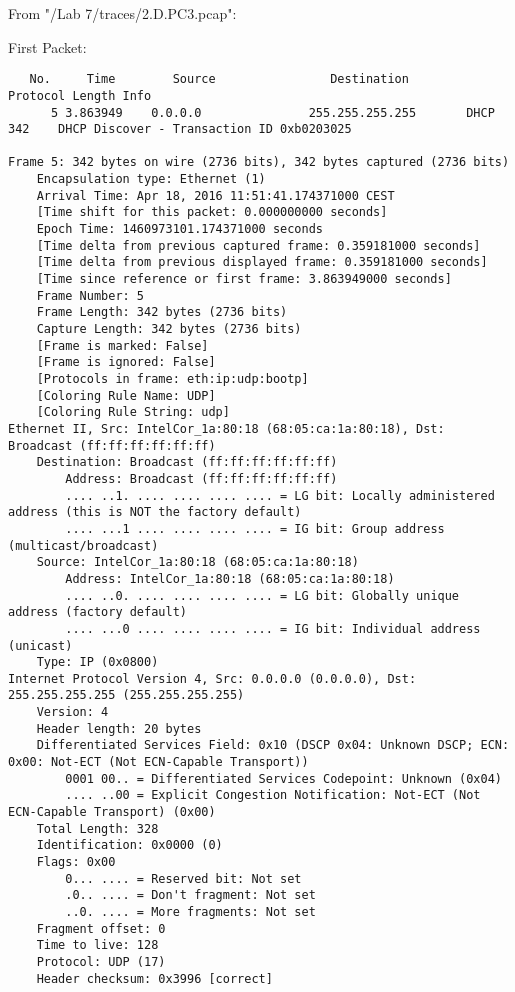 From "/Lab 7/traces/2.D.PC3.pcap":

First Packet:\\

\begin{lstlisting}
   No.     Time        Source                Destination           Protocol Length Info
      5 3.863949    0.0.0.0               255.255.255.255       DHCP     342    DHCP Discover - Transaction ID 0xb0203025

Frame 5: 342 bytes on wire (2736 bits), 342 bytes captured (2736 bits)
    Encapsulation type: Ethernet (1)
    Arrival Time: Apr 18, 2016 11:51:41.174371000 CEST
    [Time shift for this packet: 0.000000000 seconds]
    Epoch Time: 1460973101.174371000 seconds
    [Time delta from previous captured frame: 0.359181000 seconds]
    [Time delta from previous displayed frame: 0.359181000 seconds]
    [Time since reference or first frame: 3.863949000 seconds]
    Frame Number: 5
    Frame Length: 342 bytes (2736 bits)
    Capture Length: 342 bytes (2736 bits)
    [Frame is marked: False]
    [Frame is ignored: False]
    [Protocols in frame: eth:ip:udp:bootp]
    [Coloring Rule Name: UDP]
    [Coloring Rule String: udp]
Ethernet II, Src: IntelCor_1a:80:18 (68:05:ca:1a:80:18), Dst: Broadcast (ff:ff:ff:ff:ff:ff)
    Destination: Broadcast (ff:ff:ff:ff:ff:ff)
        Address: Broadcast (ff:ff:ff:ff:ff:ff)
        .... ..1. .... .... .... .... = LG bit: Locally administered address (this is NOT the factory default)
        .... ...1 .... .... .... .... = IG bit: Group address (multicast/broadcast)
    Source: IntelCor_1a:80:18 (68:05:ca:1a:80:18)
        Address: IntelCor_1a:80:18 (68:05:ca:1a:80:18)
        .... ..0. .... .... .... .... = LG bit: Globally unique address (factory default)
        .... ...0 .... .... .... .... = IG bit: Individual address (unicast)
    Type: IP (0x0800)
Internet Protocol Version 4, Src: 0.0.0.0 (0.0.0.0), Dst: 255.255.255.255 (255.255.255.255)
    Version: 4
    Header length: 20 bytes
    Differentiated Services Field: 0x10 (DSCP 0x04: Unknown DSCP; ECN: 0x00: Not-ECT (Not ECN-Capable Transport))
        0001 00.. = Differentiated Services Codepoint: Unknown (0x04)
        .... ..00 = Explicit Congestion Notification: Not-ECT (Not ECN-Capable Transport) (0x00)
    Total Length: 328
    Identification: 0x0000 (0)
    Flags: 0x00
        0... .... = Reserved bit: Not set
        .0.. .... = Don't fragment: Not set
        ..0. .... = More fragments: Not set
    Fragment offset: 0
    Time to live: 128
    Protocol: UDP (17)
    Header checksum: 0x3996 [correct]

\end{lstlisting}
